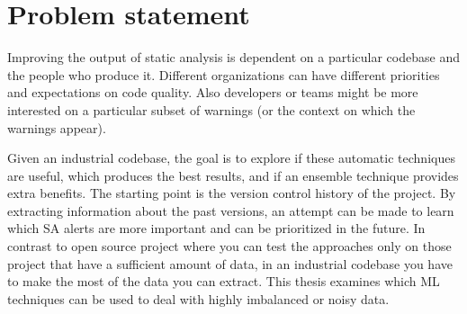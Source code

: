 
\section{Problem statement}\label{sec:problem-statement}





Improving the output of static analysis is dependent on a particular codebase and the people who produce it. Different organizations can have different priorities and expectations on code quality. Also developers or teams might be more interested on a particular subset of warnings (or the context on which the warnings appear).

Given an industrial codebase, the goal is to explore if these automatic techniques are useful, which produces the best results, and if an ensemble technique provides extra benefits. The starting point is the version control history of the project. By extracting information about the past versions, an attempt can be made to learn which SA alerts are more important and can be prioritized in the future. In contrast to open source project where you can test the approaches only on those project that have a sufficient amount of data, in an industrial codebase you have to make the most of the data you can extract. This thesis examines which ML techniques can be used to deal with highly imbalanced or noisy data.

